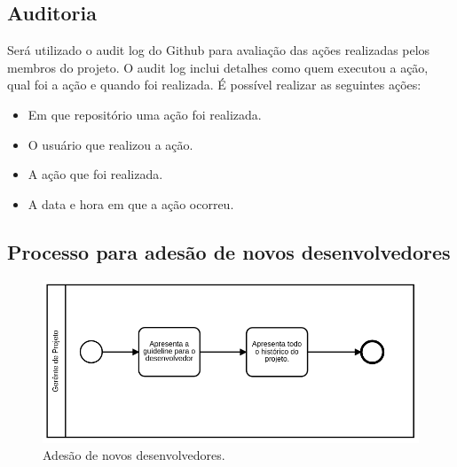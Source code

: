 \documentclass{article}
\begin{document}
		\subsection{Auditoria}
			Será utilizado o audit log do Github para avaliação das ações realizadas pelos membros do projeto. O audit log inclui detalhes como quem executou a ação, qual foi a ação e quando foi realizada.
			\newline
			É possível realizar as seguintes ações:
			\begin{itemize}
				\item Em que repositório uma ação foi realizada.
				\item O usuário que realizou a ação.
				\item A ação que foi realizada.
				\item A data e hora em que a ação ocorreu.
			\end{itemize}
        \subsection{Processo para adesão de novos desenvolvedores}
	        \begin{figure}[H]
	        	\centering
	        	\includegraphics[width=0.7\linewidth]{processo_adesao_novo_desenvolvedor}
	        	\caption{Adesão de novos desenvolvedores.}
	        	\label{fig:processoadesaonovodesenvolvedor}
	        \end{figure}
	        
\end{document}
